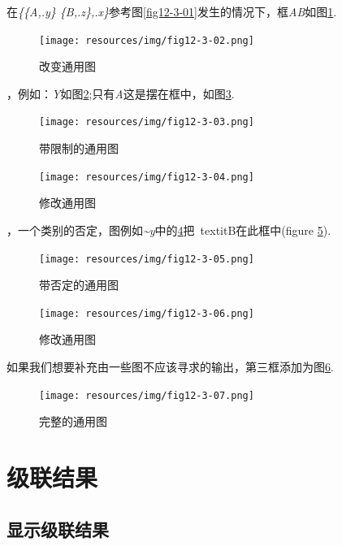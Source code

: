 在\emph{\{\{A,.y\} \{B,.z\},.x\}}参考图\ref{fig12-3-01}发生的情况下，框\textit {AB}如图\ref{fig12-3-02}.

\begin{figure}[!htb]
  \centering
  \texttt{[image: resources/img/fig12-3-02.png]}
  \caption{改变通用图}
  \label{fig12-3-02}
\end{figure}

，例如：\textit{Y}如图\ref{fig12-3-03};只有\textit{A}这是摆在框中，如图\ref{fig12-3-04}.
\begin{figure}[!htb]
  \centering
  \texttt{[image: resources/img/fig12-3-03.png]}
  \caption{带限制的通用图}
  \label{fig12-3-03}
\end{figure}

\begin{figure}[!htb]
  \centering
  \texttt{[image: resources/img/fig12-3-04.png]}
  \caption{修改通用图}
  \label{fig12-3-04}
\end{figure}

\bigskip
\bigskip
\bigskip
\bigskip
\bigskip
\bigskip
\bigskip
\bigskip
{}，一个类别的否定，图例如\textit{\textasciitilde y}中的\ref{fig12-3-05}把\ textit{B}在此框中(figure \ref{fig12-3-06}).
\begin{figure}[!htb]
  \centering
  \texttt{[image: resources/img/fig12-3-05.png]}
  \caption{带否定的通用图}
  \label{fig12-3-05}
\end{figure}


\begin{figure}[!htb]
  \centering
  \texttt{[image: resources/img/fig12-3-06.png]}
  \caption{修改通用图}
  \label{fig12-3-06}
\end{figure}

如果我们想要补充由一些图不应该寻求的输出，第三框添加为图\ref{fig12-3-07}.
\begin{figure}[!htb]
  \centering
  \texttt{[image: resources/img/fig12-3-07.png]}
  \caption{完整的通用图}
  \label{fig12-3-07}
\end{figure}

\section{级联结果}

\subsection{显示级联结果}
\label{subsec:resultsCascade}

